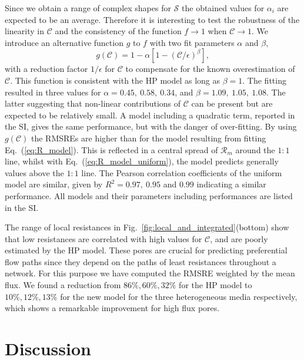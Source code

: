 \documentclass[draft]{agujournal2019}
\begin{document}
Since we obtain a range of complex shapes for $\mathcal{S}$ the obtained values for $\alpha_i$ are expected to be an average.   Therefore it is interesting to test the robustness of the linearity in $\mathcal{C}$ and the consistency of the function $f \rightarrow 1$ when $\mathcal{C}\rightarrow 1$. We introduce an alternative function $g$ to $f$ with two fit parameters $\alpha$ and $\beta$,
\begin{equation}
	g(\mathcal{C}) = 1-\alpha\left[1-\left(\mathcal{C}/\epsilon\right)^{\beta}\right] \label{eq:R_model_uniform},
\end{equation}
with a reduction factor $1/\epsilon$ for $\mathcal{C}$ to compensate for the known overestimation of $\mathcal{C}$. This function is consistent with the HP model as long as $\beta =1$. The fitting resulted in three values for $\alpha = 0.45,~0.58,~0.34$, and $\beta = 1.09,~1.05,~1.08$. The latter suggesting that non-linear contributions of $\mathcal{C}$ can be present but are expected to be relatively small. A model including a quadratic term, reported in the SI, gives the same performance, but with the danger of over-fitting. By using $g(\mathcal{C})$ the RMSREs are higher than for the model resulting from fitting Eq.~(\ref{eq:R_model}). This is reflected in a central spread of $\mathcal{R}_m$ around the $1:1$ line, whilst with Eq.~(\ref{eq:R_model_uniform}), the model predicts generally values above the $1:1$ line. The Pearson correlation coefficients of the uniform model are similar, given by $R^2 = 0.97,~0.95$ and $0.99$ indicating a similar performance. All models and their parameters including performances are listed in the SI.
 

The range of local resistances in Fig.~\ref{fig:local_and_integrated}(bottom) show that low resistances are correlated with high values for $\mathcal{C}$, and are poorly estimated by the HP model. These pores are crucial for predicting preferential flow paths since they depend on the paths of least resistances throughout a network. For this purpose we have computed the RMSRE weighted by the mean flux. We found a reduction from $86\%, 60\%, 32\%$ for the HP model to $10\%, 12\%, 13\%$ for the new model for the three heterogeneous media respectively, which shows a remarkable improvement for high flux pores.  


\section{Discussion}
\end{document}
